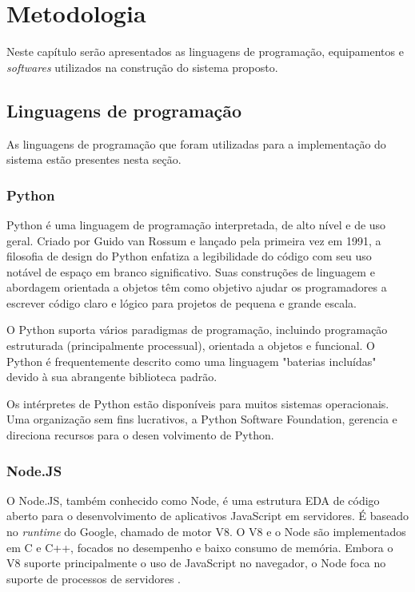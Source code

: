 \chapter{Metodologia}
Neste capítulo serão apresentados as linguagens de programação, equipamentos e \textit{softwares} utilizados na construção do sistema proposto.
\section{Linguagens de programação}

As linguagens de programação que foram utilizadas para a implementação do sistema estão presentes nesta seção.
\subsection{Python}

Python é uma linguagem de programação interpretada, de alto nível e de uso geral. Criado por Guido van Rossum e lançado pela primeira vez em 1991, a filosofia de design do Python enfatiza a legibilidade do código com seu uso notável de espaço em branco significativo. Suas construções de linguagem e abordagem orientada a objetos têm como objetivo ajudar os programadores a escrever código claro e lógico para projetos de pequena e grande escala.

O Python suporta vários paradigmas de programação, incluindo programação estruturada (principalmente processual), orientada a objetos e funcional. O Python é frequentemente descrito como uma linguagem "baterias incluídas" devido à sua abrangente biblioteca padrão.

Os intérpretes de Python estão disponíveis para muitos sistemas operacionais. Uma organização sem fins lucrativos, a Python Software Foundation, gerencia e direciona recursos para o desen
volvimento de Python. \cite{van2007python}

\subsection{Node.JS}


O Node.JS, também conhecido como Node, é uma estrutura EDA de código aberto para o desenvolvimento de aplicativos JavaScript em servidores. É baseado no \textit{runtime} do Google, chamado de motor V8. O V8 e o Node são implementados em C e C++, focados no desempenho e baixo consumo de memória. Embora o V8 suporte principalmente o uso de JavaScript no navegador, o Node foca no suporte de processos de servidores \cite{Tilkov2010}.


